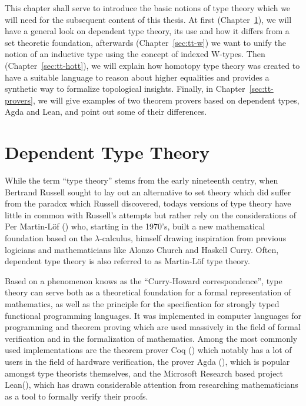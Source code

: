This chapter shall serve to introduce the basic notions of type theory which
we will need for the subsequent content of this thesis.
At first (Chapter~\ref{sec:tt-dtt}), we will have a general look on dependent type theory, its use and
how it differs from a set theoretic foundation,
afterwards (Chapter~\ref{sec:tt-w}) we want to unify the notion of an inductive
type using the concept of indexed W-types.
Then (Chapter~\ref{sec:tt-hott}), we will explain how homotopy type theory was created to have a suitable
language to reason about higher equalities and provides a synthetic way to
formalize topological insights.
Finally, in Chapter~\ref{sec:tt-provers}, we will give examples of two theorem
provers based on dependent types, Agda and Lean, and point out some of their differences.

\section{Dependent Type Theory}\label{sec:tt-dtt}

While the term ``type theory'' stems from the early nineteenth centry, when
Bertrand Russell sought to lay out an alternative to set theory which did
suffer from the paradox which Russell discovered,
todays versions of type theory have little in common with Russell's attempts
but rather rely on the considerations of Per Martin-Löf (\cite{martin-lof2, martin-lof1})
who, starting in the 1970's, built a new mathematical foundation based on the
$\lambda$-calculus, himself drawing inspiration from previous logicians and
mathematicians like Alonzo Church and Haskell Curry.
Often, dependent type theory is also referred to as Martin-Löf type theory.

Based on a phenomenon knows as the ``Curry-Howard correspondence'', type theory
can serve both as a theoretical foundation for a formal representation of mathematics,
as well as the principle for  the specification for strongly typed functional
programming languages.
It was implemented in computer languages for programming and theorem proving which
are used massively in the field of formal verification and in the formalization of
mathematics.
Among the most commonly used implementations are the theorem prover Coq (\cite{coq})
which notably has a lot of users in the field of hardware verification,
the prover Agda (\cite{agda}), which is popular amongst type theorists themselves,
and the Microsoft Research based project Lean(\cite{mouracade}), which has
drawn considerable attention from researching mathematicians as a tool to
formally verify their proofs.

